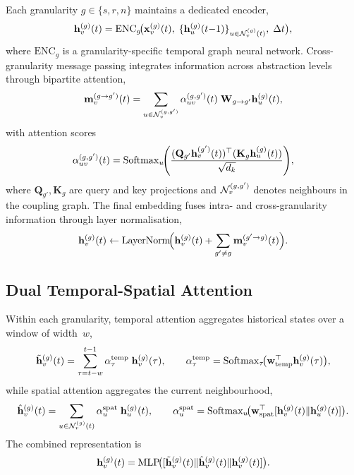 Each granularity $g\in\{s,r,n\}$ maintains a dedicated encoder,
\begin{equation}
\mathbf{h}_v^{(g)}(t)
= \mathrm{ENC}_g\!\bigl(
  \mathbf{x}_v^{(g)}(t),\;
  \{\mathbf{h}_u^{(g)}(t{-}1)\}_{u\in\mathcal{N}_v^{(g)}(t)},\;
  \Delta t
\bigr),
\label{eq:triple_enc}
\end{equation}
where $\mathrm{ENC}_g$ is a granularity-specific temporal graph neural network. Cross-granularity message passing integrates information across abstraction levels through bipartite attention,
\begin{equation}
\mathbf{m}_v^{(g\to g')}(t)
= \sum_{u\in\mathcal{N}_v^{(g,g')}}
  \alpha_{uv}^{(g,g')}(t)\;\mathbf{W}_{g\to g'}\mathbf{h}_u^{(g)}(t),
\label{eq:triple_cross_msg}
\end{equation}with attention scores\begin{equation}
\alpha_{uv}^{(g,g')}(t)
= \mathrm{Softmax}_u\!\Biggl(
  \frac{(\mathbf{Q}_{g'}\mathbf{h}_v^{(g')}(t))^\top
        (\mathbf{K}_g\mathbf{h}_u^{(g)}(t))}
       {\sqrt{d_k}}
\Biggr),
\label{eq:triple_cross_attn}
\end{equation}
where $\mathbf{Q}_{g'},\mathbf{K}_g$ are query and key projections and $\mathcal{N}_v^{(g,g')}$ denotes neighbours in the coupling graph. The final embedding fuses intra- and cross-granularity information through layer normalisation,
\begin{equation}
\mathbf{h}_v^{(g)}(t)
\leftarrow
\mathrm{LayerNorm}\!\Bigl(
  \mathbf{h}_v^{(g)}(t)
  + \sum_{g'\neq g}\mathbf{m}_v^{(g'\to g)}(t)
\Bigr).
\label{eq:triple_fuse}
\end{equation}

\subsection{Dual Temporal-Spatial Attention}

Within each granularity, temporal attention aggregates historical states over a window of width~$w$,
\begin{equation}
\tilde{\mathbf{h}}_v^{(g)}(t)
= \sum_{\tau=t-w}^{t-1}
  \alpha_\tau^{\mathrm{temp}}\;\mathbf{h}_v^{(g)}(\tau),
\qquad
\alpha_\tau^{\mathrm{temp}}
= \mathrm{Softmax}_\tau\!\bigl(
  \mathbf{w}_{\mathrm{temp}}^\top\mathbf{h}_v^{(g)}(\tau)\bigr),
\label{eq:triple_temp_attn}
\end{equation}while spatial attention aggregates the current neighbourhood,\begin{equation}
\hat{\mathbf{h}}_v^{(g)}(t)
= \sum_{u\in\mathcal{N}_v^{(g)}(t)}
  \alpha_u^{\mathrm{spat}}\;\mathbf{h}_u^{(g)}(t),
\qquad
\alpha_u^{\mathrm{spat}}
= \mathrm{Softmax}_u\!\bigl(
  \mathbf{w}_{\mathrm{spat}}^\top
  [\mathbf{h}_v^{(g)}(t)\|\mathbf{h}_u^{(g)}(t)]\bigr).
\label{eq:triple_spat_attn}
\end{equation}The combined representation is\begin{equation}
\mathbf{h}_v^{(g)}(t)
= \mathrm{MLP}\!\bigl(
  [\tilde{\mathbf{h}}_v^{(g)}(t)\|
   \hat{\mathbf{h}}_v^{(g)}(t)\|
   \mathbf{h}_v^{(g)}(t)]
\bigr).
\label{eq:triple_combined}
\end{equation}

